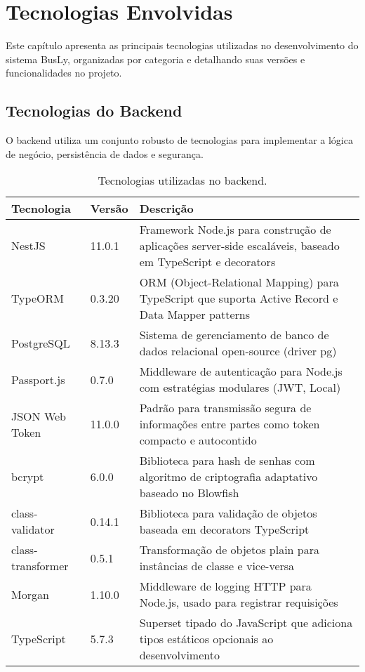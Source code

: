 \chapter{Tecnologias Envolvidas} \label{cha:tecnologias}

Este capítulo apresenta as principais tecnologias utilizadas no desenvolvimento do sistema BusLy, organizadas por categoria e detalhando suas versões e funcionalidades no projeto.

\section{Tecnologias do Backend}

O backend utiliza um conjunto robusto de tecnologias para implementar a lógica de negócio, persistência de dados e segurança.

\begin{table}[H]
\centering
\caption{Tecnologias utilizadas no backend.}
\label{tab:tecnologias-backend}
\begin{tabular}{|p{3cm}|p{2cm}|p{8cm}|}
\hline
\textbf{Tecnologia} & \textbf{Versão} & \textbf{Descrição} \\
\hline
NestJS & 11.0.1 & Framework Node.js para construção de aplicações server-side escaláveis, baseado em TypeScript e decorators \\
\hline
TypeORM & 0.3.20 & ORM (Object-Relational Mapping) para TypeScript que suporta Active Record e Data Mapper patterns \\
\hline
PostgreSQL & 8.13.3 & Sistema de gerenciamento de banco de dados relacional open-source (driver pg) \\
\hline
Passport.js & 0.7.0 & Middleware de autenticação para Node.js com estratégias modulares (JWT, Local) \\
\hline
JSON Web Token & 11.0.0 & Padrão para transmissão segura de informações entre partes como token compacto e autocontido \\
\hline
bcrypt & 6.0.0 & Biblioteca para hash de senhas com algoritmo de criptografia adaptativo baseado no Blowfish \\
\hline
class-validator & 0.14.1 & Biblioteca para validação de objetos baseada em decorators TypeScript \\
\hline
class-transformer & 0.5.1 & Transformação de objetos plain para instâncias de classe e vice-versa \\
\hline
Morgan & 1.10.0 & Middleware de logging HTTP para Node.js, usado para registrar requisições \\
\hline
TypeScript & 5.7.3 & Superset tipado do JavaScript que adiciona tipos estáticos opcionais ao desenvolvimento \\
\hline
\end{tabular}
\end{table}

